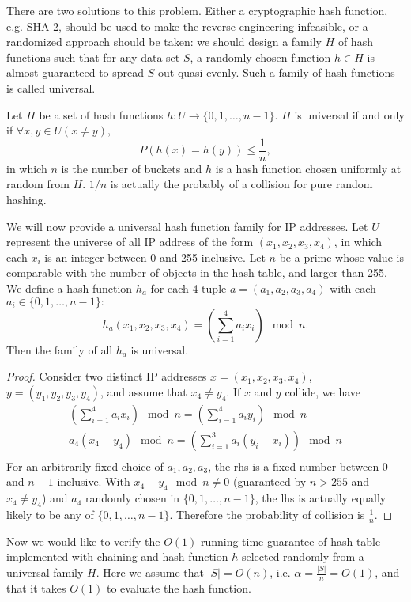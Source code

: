 There are two solutions to this problem. Either a cryptographic hash function, e.g. SHA-2, should be used to make the reverse engineering infeasible, or a randomized approach should be taken: we should design a family $H$ of hash functions such that for any data set $S$, a randomly chosen function $h\in H$ is almost guaranteed to spread $S$ out quasi-evenly. Such a family of hash functions is called universal.
\begin{definition}
Let $H$ be a set of hash functions $h:U\rightarrow\{0,1,\dots,n-1\}$. $H$ is universal if and only if $\forall x,y\in U(x\neq y),$ 
$$P(h(x)=h(y))\leq \frac{1}{n},$$
in which $n$ is the number of buckets and $h$ is a hash function chosen uniformly at random from $H$. $1/n$ is actually the probably of a collision for pure random hashing.
\end{definition}
We will now provide a universal hash function family for IP addresses. Let $U$ represent the universe of all IP address of the form $(x_1,x_2,x_3,x_4)$, in which each $x_i$ is an integer between 0 and 255 inclusive. Let $n$ be a prime whose value is comparable with the number of objects in the hash table, and larger than 255. We define a hash function $h_a$ for each 4-tuple $a=(a_1,a_2,a_3,a_4)$ with each $a_i\in\{0,1,\dots,n-1\}:$
$$h_a(x_1,x_2,x_3,x_4)=\left(\sum\limits_{i=1}^4a_ix_i\right)\mod n.$$ 
Then the family of all $h_a$ is universal.
\begin{proof}
Consider two distinct IP addresses $x=(x_1,x_2,x_3,x_4)$, $y=(y_1,y_2,y_3,y_4)$, and assume that $x_4\neq y_4$. If $x$ and $y$ collide, we have 
\begin{align*}
\left(\sum\limits_{i=1}^4a_ix_i\right)\mod n=\left(\sum\limits_{i=1}^4a_iy_i\right)\mod n\\
a_4(x_4-y_4)\mod n=\left(\sum\limits_{i=1}^3a_i(y_i-x_i)\right)\mod n\\
\end{align*}
For an arbitrarily fixed choice of $a_1,a_2,a_3$, the rhs is a fixed number between 0 and $n-1$ inclusive. With $x_4-y_4\mod n\neq 0$ (guaranteed by $n>255$ and $x_4\neq y_4$) and $a_4$ randomly chosen in $\{0,1,\dots,n-1\}$, the lhs is actually equally likely to be any of $\{0,1,\dots,n-1\}$. Therefore the probability of collision is $\frac{1}{n}$. 
\end{proof}
Now we would like to verify the $O(1)$ running time guarantee of hash table implemented with chaining and hash function $h$ selected randomly from a universal family $H$. Here we assume that $\lvert S\rvert=O(n)$, i.e. $\alpha=\frac{\lvert S\rvert}{n}=O(1)$, and that it takes $O(1)$ to evaluate the hash function. 
